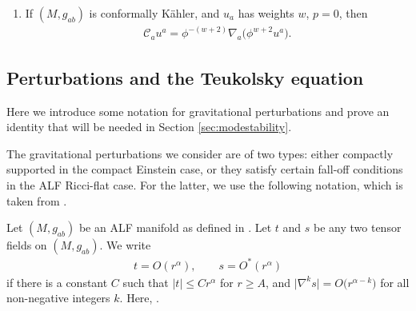 \documentclass[pdftex]{sigma}
\numberwithin{equation}{section}
\begin{document}
\begin{Remark}
\begin{enumerate}
$(M,g_{ab})$ is conformally K\"ahler iff it is Hermitian and $f_{a}=\nabla_{a}\log\phi$ for some scalar field $\phi$ (with $w=-1$, $p=0$). This field satisfies
\begin{align*}
\mathcal{C}_{a}\phi=0.
\end{align*}
For example, in the Einstein--Hermitian case we have that
\cite[Remark 5.1]{araneda2021conformal}
\begin{align} \label{phiEinstein}
\phi \propto \Psi^{1/3}_{2}.
\end{align}
\item
If $(M,g_{ab})$ is conformally K\"ahler, and $u_{a}$ has weights $w$, $p=0$, then
\begin{align} \label{identity}
\mathcal{C}_{a}u^{a} = \phi^{-(w+2)}\nabla_{a}\bigl(\phi^{w+2}u^{a}\bigr).
\end{align}
\end{enumerate}
\end{Remark}


\subsection{Perturbations and the Teukolsky equation}
\label{sec:perturbations}

Here we introduce some notation for gravitational perturbations and prove an identity that will be needed in Section \ref{sec:modestability}.

The gravitational perturbations we consider are of two types: either compactly supported in the compact Einstein case, or they satisfy certain fall-off conditions in the ALF Ricci-flat case. For the latter, we use the following notation, which is taken from \cite{2023arXiv230614567A}.
\begin{Definition}\label{def:Onotation}
Let $(M,g_{ab})$ be an ALF manifold as defined in \cite[Definition~2.1]{2023arXiv230614567A}. Let $t$ and $s$ be any two tensor fields on $(M,g_{ab})$. We write
\begin{align*}%
 t = O(r^{\alpha}), \qquad s = O^{*}(r^{\alpha})
\end{align*}
if there is a constant $C$ such that $|t|\leq C r^{\alpha}$ for $r\geq A$, and $\bigl|\nabla^{k}s\bigr|=O\bigl(r^{\alpha-k}\bigr)$ for all non-negative integers $k$. Here, .
\end{Definition}
\end{document}
